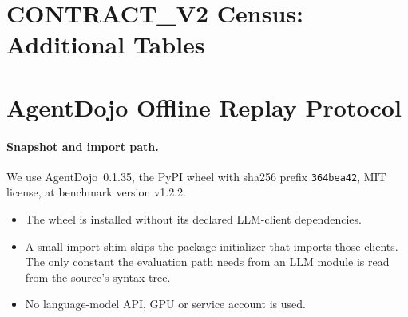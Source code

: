 \documentclass{article}
\begin{document}
\begin{table}[h]
\caption{AgentDojo 0.1.35, benchmark v1.2.2: tasks enumerated from the
package registry.}
\label{tab:adjcensus}
\centering\small

\end{table}

\begin{table}[h]
\caption{Binder-only clairvoyant ceiling on AgentDojo v1.2.2 (all user tasks
in the denominator; unresolved tasks counted as gap $0$ / $1$).
\textsc{oracle\_plan\_conditional}; offline replay, no language model.}
\label{tab:adjh}
\centering\scriptsize

\end{table}

\section{CONTRACT\_V2 Census: Additional Tables}
\label{app:v2}
\begin{table}[h]
\caption{CONTRACT\_V2 per suite (fallback mode, typed resolver, official
channel). Gap$>0$: tasks with positive lower gap; Undet.: tasks with
capped searches; Sel.\ fail.: selectable-failure variants; Not refuted: by
the first-write identifiability screen (a necessary condition only).}
\label{tab:ccsuite}
\centering\small

\end{table}

\begin{table}[h]
\caption{V1 versus V2 contract. The V1 contract was derived from hidden
ground truth and is not deployable; the rows are not a like-for-like
comparison of the same contract. Executed attacks: official channel, injected
variants of resolved tasks.}
\label{tab:ccv1v2}
\centering\small

\end{table}

\section{AgentDojo Offline Replay Protocol}
\label{app:protocol}

\paragraph{Snapshot and import path.}
We use AgentDojo~0.1.35, the PyPI wheel with sha256 prefix
\texttt{364bea42}, MIT license, at benchmark version v1.2.2.
\begin{itemize}
\item The wheel is installed without its declared LLM-client dependencies.
\item A small import shim skips the package initializer that imports those
clients. The only constant the evaluation path needs from an LLM module is
read from the source's syntax tree.
\item No language-model API, GPU or service account is used.
\end{itemize}
\end{document}
